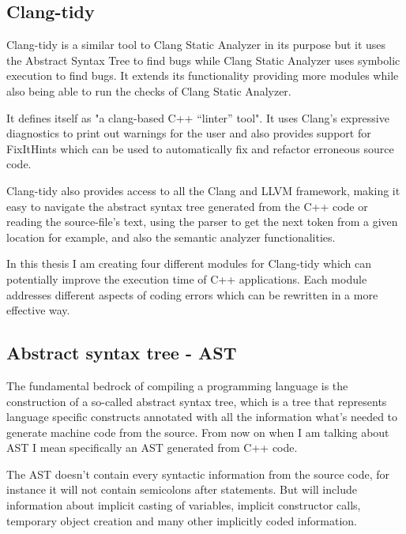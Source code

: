 \subsection{Clang-tidy}
\par Clang-tidy is a similar tool to Clang Static Analyzer in its purpose but it uses the Abstract Syntax Tree to find bugs while Clang Static Analyzer uses symbolic execution to find bugs. It extends its functionality providing more modules while also being able to run the checks of Clang Static Analyzer. \medskip
\par It defines itself as "a clang-based C++ “linter” tool"\cite{clang_tidy_mainpage}. It uses Clang's expressive diagnostics to print out warnings for the user and also provides support for FixItHints which can be used to automatically fix and refactor erroneous source code. \medskip
\par Clang-tidy also provides access to all the Clang and LLVM framework, making it easy to navigate the abstract syntax tree generated from the C++ code or reading the source-file's text, using the parser to get the next token from a given location for example, and also the semantic analyzer functionalities.\medskip
\par In this thesis I am creating four different modules for Clang-tidy which can potentially improve the execution time of C++ applications. Each module addresses different aspects of coding errors which can be rewritten in a more effective way. 
\subsection{Abstract syntax tree - AST}
\par The fundamental bedrock of compiling a programming language is the construction of a so-called abstract syntax tree, which is a tree that represents language specific constructs annotated with all the information what's needed to generate machine code from the source. From now on when I am talking about AST I mean specifically an AST generated from C++ code. \medskip
\par The AST doesn't contain every syntactic information from the source code, for instance it will not contain semicolons after statements. But will include information about implicit casting of variables, implicit constructor calls, temporary object creation and many other implicitly coded information. 

